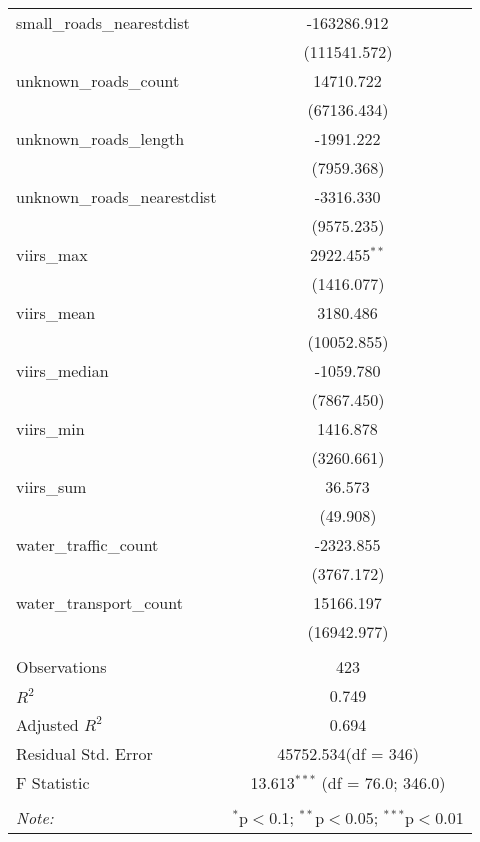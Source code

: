 \begin{table}[!htbp]
\begin{tabular}{@{\extracolsep{5pt}}lc}
 small_roads_nearestdist & -163286.912$^{}$ \\
  & (111541.572) \\
 unknown_roads_count & 14710.722$^{}$ \\
  & (67136.434) \\
 unknown_roads_length & -1991.222$^{}$ \\
  & (7959.368) \\
 unknown_roads_nearestdist & -3316.330$^{}$ \\
  & (9575.235) \\
 viirs_max & 2922.455$^{**}$ \\
  & (1416.077) \\
 viirs_mean & 3180.486$^{}$ \\
  & (10052.855) \\
 viirs_median & -1059.780$^{}$ \\
  & (7867.450) \\
 viirs_min & 1416.878$^{}$ \\
  & (3260.661) \\
 viirs_sum & 36.573$^{}$ \\
  & (49.908) \\
 water_traffic_count & -2323.855$^{}$ \\
  & (3767.172) \\
 water_transport_count & 15166.197$^{}$ \\
  & (16942.977) \\
\hline \\[-1.8ex]
 Observations & 423 \\
 $R^2$ & 0.749 \\
 Adjusted $R^2$ & 0.694 \\
 Residual Std. Error & 45752.534(df = 346)  \\
 F Statistic & 13.613$^{***}$ (df = 76.0; 346.0) \\
\hline
\hline \\[-1.8ex]
\textit{Note:} & \multicolumn{1}{r}{$^{*}$p$<$0.1; $^{**}$p$<$0.05; $^{***}$p$<$0.01} \\
\end{tabular}
\end{table}